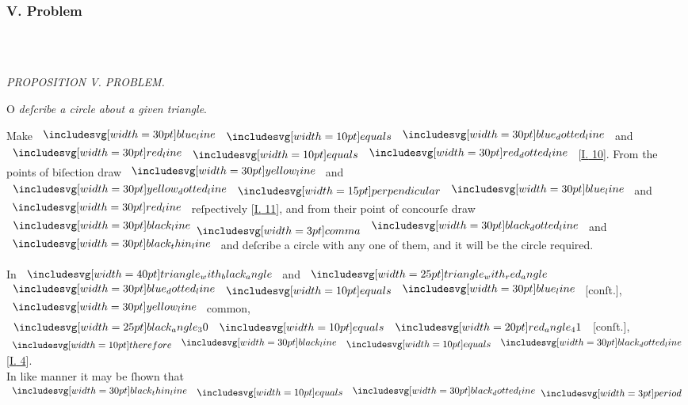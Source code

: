 \documentclass[12pt,preview]{standalone}
\begin{document}
\subsubsection{V. Problem}

\begin{minipage}[t]{0.33\textwidth}
    \vspace{40pt}
    
    \hfill\\
    
    \hfill\\
    
\end{minipage}%
\hfill
\begin{minipage}[t]{0.64\textwidth}
    \vspace{0pt}

    \begin{center}
        \textit{PROPOSITION V. PROBLEM.}\label{book4pr5} \\
    \end{center}

    \hfill

    \begin{center}
        \raggedright \lettrine[lines=4, loversize=1, nindent=0pt]{}{}O \textit{deſcribe a circle about a given triangle}.
    \end{center}

    \hfill

    \hfill

    \hfill

    \hfill

    \raggedright Make $\blueline \bequals \dottedblueline$ and $\redline \bequals \dottedredline$ [\hyperref[book1pr10]{\textsc{I.} 10}]. From the points of biſection draw $\yellowline$ and $\dottedyellowline \bperp \blueline$ and $\redline$ reſpectively [\hyperref[book1pr11]{\textsc{I.} 11}], and from their point of concourſe draw $\blackline \bcomma \dottedblackline$ and $\blackthinline$ and deſcribe a circle with any one of them, and it will be the circle required.

    \hfill

    \begin{center}
        In $\img[0][0][40]{triangle_with_black_angle}$ and $\img{triangle_with_red_angle}$\\
        $\dottedblueline \bequals \blueline$ [conſt.],\\
        $\yellowline$ common,\\
        $\img{black_angle_30} \bequals \img[0][0][20]{red_angle_41}$ [conſt.],\\
        $\btherefore \blackline \bequals \dottedblackline$ [\hyperref[book1pr4]{\textsc{I.} 4}].
        \hfill\\
        In like manner it may be ſhown that
        $\blackthinline \bequals \dottedblackline \bperiod$
    \end{center}


\end{minipage}
\end{document}
